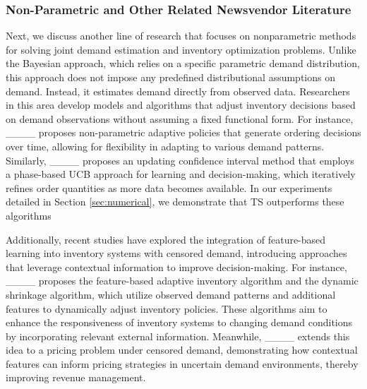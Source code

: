 
% 
\subsubsection{Non-Parametric and Other Related Newsvendor Literature}
Next, we discuss another line of research that focuses on nonparametric methods for solving joint demand estimation and inventory optimization problems. Unlike the Bayesian approach, which relies on a specific parametric demand distribution, this approach does not impose any predefined distributional assumptions on demand. Instead, it estimates demand directly from observed data. Researchers in this area develop models and algorithms that adjust inventory decisions based on demand observations without assuming a fixed functional form. For instance, ____ proposes non-parametric adaptive policies that generate ordering decisions over time, allowing for flexibility in adapting to various demand patterns. Similarly, ____ proposes an updating confidence interval method that employs a phase-based UCB approach for learning and decision-making, which iteratively refines order quantities as more data becomes available. In our experiments detailed in Section \ref{sec:numerical}, we demonstrate that TS outperforms these algorithms %

Additionally, recent studies have explored the integration of feature-based learning into inventory systems with censored demand, introducing approaches that leverage contextual information to improve decision-making. For instance, ____ proposes the feature-based adaptive inventory algorithm and the dynamic shrinkage algorithm, which utilize observed demand patterns and additional features to dynamically adjust inventory policies. These algorithms aim to enhance the responsiveness of inventory systems to changing demand conditions by incorporating relevant external information. Meanwhile, ____ extends this idea to a pricing problem under censored demand, demonstrating how contextual features can inform pricing strategies in uncertain demand environments, thereby improving revenue management.



